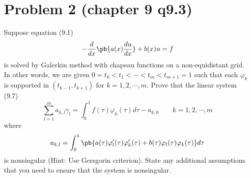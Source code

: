 \documentclass[11pt]{article}
\begin{document}
\newpage
\section*{Problem 2 (chapter 9 q9.3)}
Suppose equation (9.1) 
\[
    - \frac{d}{dx} \pb{
        a(x) \frac{du}{dx}
    } + b(x)u = f
\]
is solved by Galerkin method with chapeau functions on a non-equidistant grid. In other words, we are given $0=t_0<t_1<\cdots < t_m<t_{m+1} = 1$ such that each $\varphi_k$ is supported in $(t_{k-1}, t_{k+1})$ for $k=1,2,\cdots,m$. Prove that the linear system (9.7) 
\[
    \sum_{l=1}^m a_{k,l} \gamma_l = \int_0^1 f(\tau) \varphi_k(\tau) d\tau - a_{k,0} \quad \quad k=1,2,\cdots,m    
\]
where 
\[
    a_{k,l} = \int_0^1 \pb{
        a(\tau) \varphi'_l(\tau) \varphi'_k(\tau) + b(\tau) \varphi_l(\tau) \varphi_k(\tau)
    } d\tau
\]
is nonsingular (Hint: Use Gersgorin criterion). State any additional assumptions that you need to ensure that the system is nonsingular.
\end{document}
